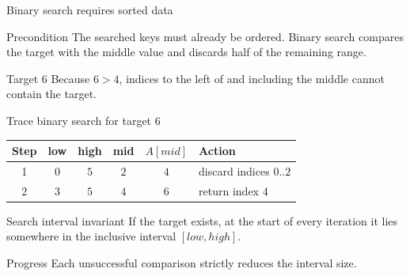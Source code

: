 \documentclass[aspectratio=169]{beamer}
\begin{document}
\begin{frame}{Binary search requires sorted data}
  \begin{block}{Precondition}
    The searched keys must already be ordered. Binary search compares the target
    with the middle value and discards half of the remaining range.
  \end{block}
  \begin{center}
  \end{center}
  \begin{alertblock}{Target $6$}
    Because $6>4$, indices to the left of and including the middle cannot
    contain the target.
  \end{alertblock}
\end{frame}

\begin{frame}{Trace binary search for target $6$}
  \small
  \begin{center}
    \begin{tabular}{cccccl}
      \toprule
      \textbf{Step} & \textbf{low} & \textbf{high} & \textbf{mid} &
      \textbf{$A[mid]$} & \textbf{Action} \\
      \midrule
      1 & $0$ & $5$ & $2$ & $4$ & discard indices $0..2$ \\
      2 & $3$ & $5$ & $4$ & $6$ & return index $4$ \\
      \bottomrule
    \end{tabular}
  \end{center}
  \begin{block}{Search interval invariant}
    If the target exists, at the start of every iteration it lies somewhere in
    the inclusive interval $[low,high]$.
  \end{block}
  \begin{exampleblock}{Progress}
    Each unsuccessful comparison strictly reduces the interval size.
  \end{exampleblock}
\end{frame}
\end{document}
